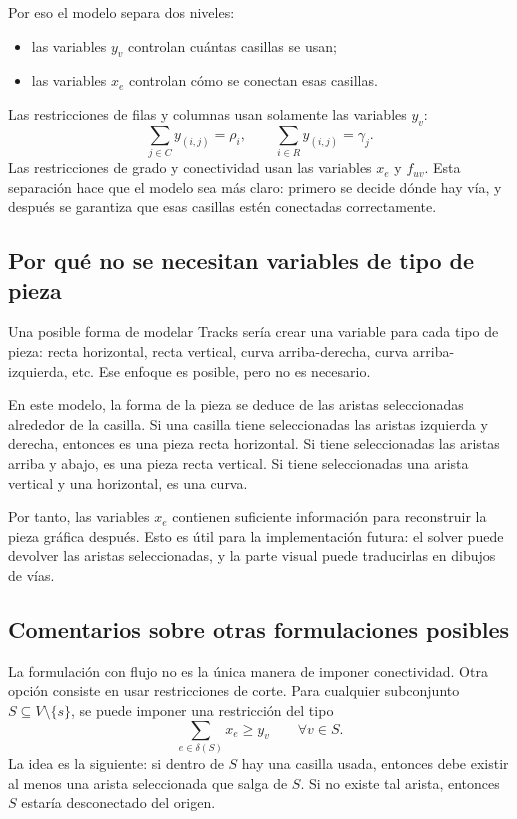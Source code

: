 Por eso el modelo separa dos niveles:
\begin{itemize}[leftmargin=2em]
    \item las variables \(y_v\) controlan cuántas casillas se usan;
    \item las variables \(x_e\) controlan cómo se conectan esas casillas.
\end{itemize}

Las restricciones de filas y columnas usan solamente las variables \(y_v\):
\[
    \sum_{j \in C} y_{(i,j)} = \rho_i,
    \qquad
    \sum_{i \in R} y_{(i,j)} = \gamma_j.
\]
Las restricciones de grado y conectividad usan las variables \(x_e\) y \(f_{uv}\). Esta separación hace que el modelo sea más claro: primero se decide dónde hay vía, y después se garantiza que esas casillas estén conectadas correctamente.

\subsection{Por qué no se necesitan variables de tipo de pieza}

Una posible forma de modelar Tracks sería crear una variable para cada tipo de pieza: recta horizontal, recta vertical, curva arriba-derecha, curva arriba-izquierda, etc. Ese enfoque es posible, pero no es necesario.

En este modelo, la forma de la pieza se deduce de las aristas seleccionadas alrededor de la casilla. Si una casilla tiene seleccionadas las aristas izquierda y derecha, entonces es una pieza recta horizontal. Si tiene seleccionadas las aristas arriba y abajo, es una pieza recta vertical. Si tiene seleccionadas una arista vertical y una horizontal, es una curva.

Por tanto, las variables \(x_e\) contienen suficiente información para reconstruir la pieza gráfica después. Esto es útil para la implementación futura: el solver puede devolver las aristas seleccionadas, y la parte visual puede traducirlas en dibujos de vías.

\subsection{Comentarios sobre otras formulaciones posibles}

La formulación con flujo no es la única manera de imponer conectividad. Otra opción consiste en usar restricciones de corte. Para cualquier subconjunto \(S \subseteq V\setminus \{s\}\), se puede imponer una restricción del tipo
\[
    \sum_{e \in \delta(S)} x_e \geq y_v
    \qquad \forall v \in S.
\]
La idea es la siguiente: si dentro de \(S\) hay una casilla usada, entonces debe existir al menos una arista seleccionada que salga de \(S\). Si no existe tal arista, entonces \(S\) estaría desconectado del origen.

